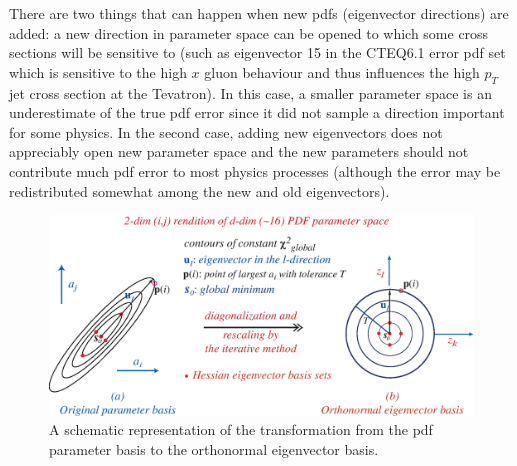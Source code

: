 \documentclass[12pt]{iopart}
\begin{document}
There are two things that can happen when new pdfs (eigenvector directions) are added: a new direction in parameter space can be
opened to which some cross sections will be sensitive to (such as eigenvector 15 in the CTEQ6.1 error pdf set which is sensitive
to the high $x$ gluon behaviour and thus influences the high $p_T$ jet cross section at the Tevatron). In this case, a smaller
parameter space is an underestimate of the true pdf error since it did not sample a direction important for some physics. In the
second case, adding new eigenvectors does not appreciably open new parameter space and the new parameters should not contribute
much pdf error to most physics processes (although the error may be redistributed somewhat among the new and old eigenvectors).
%
\begin{figure}[t]
\begin{center}
\includegraphics[width=12cm]{HesseMethod.eps}
\end{center}
\caption{
A schematic representation of the transformation from the pdf parameter basis to the orthonormal eigenvector basis. 
} 
\label{fig:Hesse}
\end{figure}
%
\end{document}
